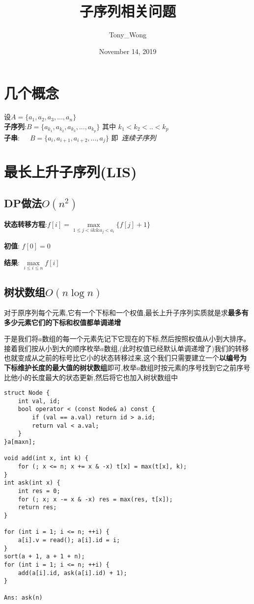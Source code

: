 \documentclass[UTF8]{ctexart}
\author{Tony\_Wong}
\date{November 14, 2019}
\title{\huge \textbf{子序列}相关问题}
\begin{document}
\maketitle
\tableofcontents

\setcounter{section}{-1}

\section{几个概念}
设$A=\{a_1, a_2, a_3, ..., a_n\}$\\
\textbf{子序列}:$B=\{a_{k_1}, a_{k_2}, a_{k_3}, ..., a_{k_p}\}$ 其中 $k_1 < k_2 < .. < k_p$\\
\textbf{子串}:\ \ \ $B=\{a_i, a_{i + 1}, a_{i + 2}, ..., a_{j} \}$ 即\ \emph{连续子序列}

\section{最长上升子序列(LIS)}
\subsection{DP做法$O(n^2)$}

\textbf{状态转移方程}:$ f[i]=\max\limits_{1\leq j<i \&\& a_j < a_i}\{f[j] + 1\} $

\textbf{初值}: $f[0]=0$

\textbf{结果}: $ \max\limits_{i\leq i\leq n}f[i] $\\

\subsection{树状数组$O(n\log n)$}

对于原序列每个元素,它有一个下标和一个权值,最长上升子序列实质就是求\textbf{最多有多少元素它们的下标和权值都单调递增}

于是我们将$a$数组的每一个元素先记下它现在的下标,然后按照权值从小到大排序。接着我们按从小到大的顺序枚举$a$数组,(此时权值已经默认单调递增了)我们的转移也就变成从之前的标号比它小的状态转移过来,这个我们只需要建立一个\textbf{以编号为下标维护长度的最大值的树状数组}即可,枚举$a$数组时按元素的序号找到它之前序号比他小的长度最大的状态更新,然后将它也加入树状数组中

\begin{lstlisting}
struct Node {
	int val, id;
	bool operator < (const Node& a) const {
		if (val == a.val) return id > a.id;
		return val < a.val;
	}
}a[maxn];

void add(int x, int k) { 
	for (; x <= n; x += x & -x) t[x] = max(t[x], k); 
}
int ask(int x) {
	int res = 0;
	for (; x; x -= x & -x) res = max(res, t[x]);
	return res;
}

for (int i = 1; i <= n; ++i) {
	a[i].v = read(); a[i].id = i;
}
sort(a + 1, a + 1 + n);
for (int i = 1; i <= n; ++i) {
	add(a[i].id, ask(a[i].id) + 1);
}

Ans: ask(n)
\end{lstlisting} 
\end{document}
